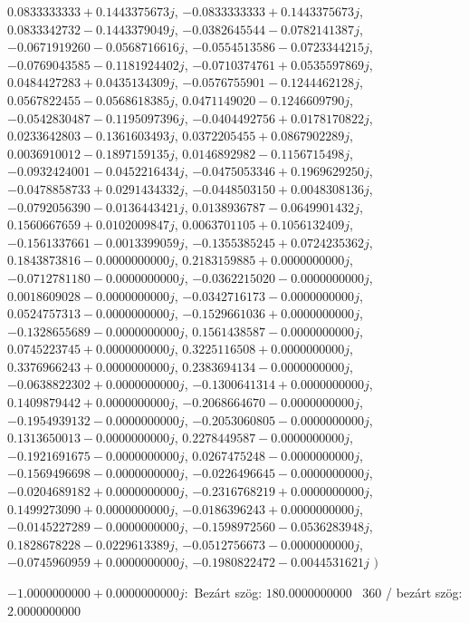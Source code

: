 \documentclass[14pt,a4paper]{article}
\begin{document}
\begin{itemize}
$0.0833333333+0.1443375673j$, $-0.0833333333+0.1443375673j$, $0.0833342732-0.1443379049j$, $-0.0382645544-0.0782141387j$, $-0.0671919260-0.0568716616j$, $-0.0554513586-0.0723344215j$, $-0.0769043585-0.1181924402j$, $-0.0710374761+0.0535597869j$, $0.0484427283+0.0435134309j$, $-0.0576755901-0.1244462128j$, $0.0567822455-0.0568618385j$, $0.0471149020-0.1246609790j$, $-0.0542830487-0.1195097396j$, $-0.0404492756+0.0178170822j$, $0.0233642803-0.1361603493j$, $0.0372205455+0.0867902289j$, $0.0036910012-0.1897159135j$, $0.0146892982-0.1156715498j$, $-0.0932424001-0.0452216434j$, $-0.0475053346+0.1969629250j$, $-0.0478858733+0.0291434332j$, $-0.0448503150+0.0048308136j$, $-0.0792056390-0.0136443421j$, $0.0138936787-0.0649901432j$, $0.1560667659+0.0102009847j$, $0.0063701105+0.1056132409j$, $-0.1561337661-0.0013399059j$, $-0.1355385245+0.0724235362j$, $0.1843873816-0.0000000000j$, $0.2183159885+0.0000000000j$, $-0.0712781180-0.0000000000j$, $-0.0362215020-0.0000000000j$, $0.0018609028-0.0000000000j$, $-0.0342716173-0.0000000000j$, $0.0524757313-0.0000000000j$, $-0.1529661036+0.0000000000j$, $-0.1328655689-0.0000000000j$, $0.1561438587-0.0000000000j$, $0.0745223745+0.0000000000j$, $0.3225116508+0.0000000000j$, $0.3376966243+0.0000000000j$, $0.2383694134-0.0000000000j$, $-0.0638822302+0.0000000000j$, $-0.1300641314+0.0000000000j$, $0.1409879442+0.0000000000j$, $-0.2068664670-0.0000000000j$, $-0.1954939132-0.0000000000j$, $-0.2053060805-0.0000000000j$, $0.1313650013-0.0000000000j$, $0.2278449587-0.0000000000j$, $-0.1921691675-0.0000000000j$, $0.0267475248-0.0000000000j$, $-0.1569496698-0.0000000000j$, $-0.0226496645-0.0000000000j$, $-0.0204689182+0.0000000000j$, $-0.2316768219+0.0000000000j$, $0.1499273090+0.0000000000j$, $-0.0186396243+0.0000000000j$, $-0.0145227289-0.0000000000j$, $-0.1598972560-0.0536283948j$, $0.1828678228-0.0229613389j$, $-0.0512756673-0.0000000000j$, $-0.0745960959+0.0000000000j$, $-0.1980822472-0.0044531621j$
$\big)$
\end{itemize}
$-1.0000000000+0.0000000000j$:\
Bezárt szög: $180.0000000000$ \
360 / bezárt szög: $2.0000000000$\
\end{document}
